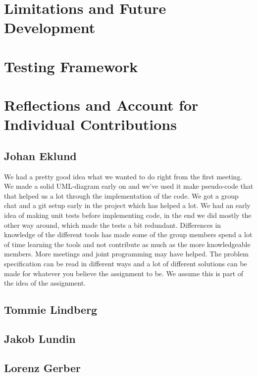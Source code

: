 \documentclass[a4paper,11pt,twoside]{article}
\begin{document}
\section{Limitations and Future Development}

\section{Testing Framework}


\section{Reflections and Account for Individual Contributions}
\subsection{Johan Eklund}
We had a pretty good idea what we wanted to do right from the first
meeting. We made a  solid UML-diagram early on and we've used it make
pseudo-code that that helped us a lot through the implementation of
the code. We got a group chat and a git setup early in the project
which has helped a lot. We had an early idea of making unit tests
before implementing code, in the end we did mostly the other way
around, which made the tests a bit redundant. Differences in
knowledge of the different tools has made some of the group members
spend a lot of time learning the tools and not contribute as much as
the more knowledgeable members. More meetings and joint programming
may have helped. The problem specification can be read in different
ways and a lot of different solutions can be made for whatever you
believe the assignment to be. We assume this is part of the idea of
the assignment.

\subsection{Tommie Lindberg}
\subsection{Jakob Lundin}
\subsection{Lorenz Gerber}


\end{document}
